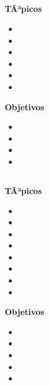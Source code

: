 \subsection{\NCSEISDef }\label{sec:BOK-NC6}

\textbf{TÃ³picos}
\begin{itemize}
	\item \NCSEISTopicVista
	\item \NCSEISTopicUso
	\item \NCSEISTopicNombres
	\item \NCSEISTopicProveedores
	\item \NCSEISTopicAsuntos
	\item \NCSEISTopicAsuntosde
\end{itemize}

\textbf{Objetivos}
\begin{itemize}
	\item \NCSEISObjUNO
	\item \NCSEISObjDOS
	\item \NCSEISObjTRES
	\item \NCSEISObjCUATRO
\end{itemize}

\subsection{\NCSIETEDef }\label{sec:BOK-NC7}

\textbf{TÃ³picos}
\begin{itemize}
	\item \NCSIETETopicRepresentaciones
	\item \NCSIETETopicAlgoritmos
	\item \NCSIETETopicCompresion
	\item \NCSIETETopicCompresionde
	\item \NCSIETETopicAudio
	\item \NCSIETETopicImagenes
	\item \NCSIETETopicVideo
	\item \NCSIETETopicMedidas
\end{itemize}

\textbf{Objetivos}
\begin{itemize}
	\item \NCSIETEObjUNO
	\item \NCSIETEObjDOS
	\item \NCSIETEObjTRES
	\item \NCSIETEObjCUATRO
	\item \NCSIETEObjCINCO
\end{itemize}

